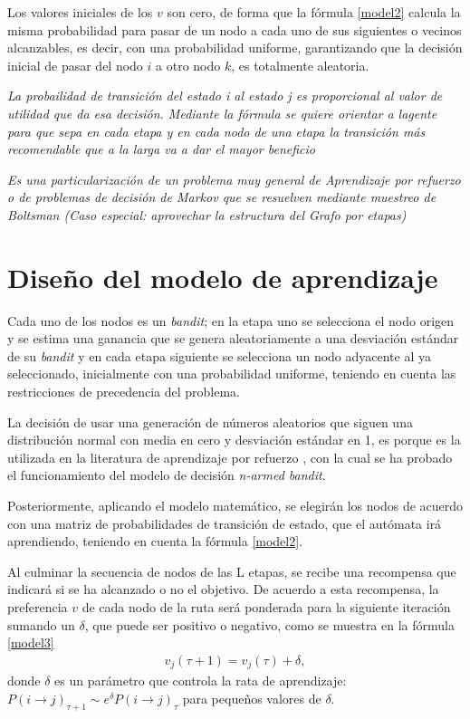 Los valores iniciales de los $v$ son cero, de forma que la fórmula \ref{model2} calcula la misma probabilidad para pasar de un nodo a cada uno de sus siguientes o vecinos alcanzables, es decir, con una probabilidad uniforme, garantizando que la decisión inicial de pasar del nodo $i$ a otro nodo $k$, es totalmente aleatoria.

\textit{La probailidad de transición del estado i al estado j es proporcional al valor de utilidad que da esa decisión. Mediante la fórmula se quiere orientar a lagente para que sepa en cada etapa y en cada nodo de una etapa la transición más recomendable que a la larga va a dar el mayor beneficio}

\textit{Es una particularización de un problema muy general de Aprendizaje por refuerzo o de problemas de decisión de Markov que se resuelven mediante muestreo de Boltsman (Caso especial: aprovechar la estructura del Grafo por etapas)}

\section{Diseño del modelo de aprendizaje} \label{aprende}
Cada uno de los nodos es un \textit{bandit}; en la etapa uno se selecciona el nodo origen y se estima una ganancia que se genera aleatoriamente a una desviación estándar de su \textit{bandit} y en cada etapa siguiente se selecciona un nodo adyacente al ya seleccionado, inicialmente con una probabilidad uniforme, teniendo en cuenta las restricciones de precedencia del problema. 

La decisión de usar una generación de números aleatorios que siguen una distribución normal con media en cero y desviación estándar en 1, es porque es la utilizada en la literatura de aprendizaje por refuerzo \citep{sutton1992reinforcement}, con la cual se ha probado el funcionamiento del modelo de decisión \textit{n-armed bandit}. 

Posteriormente, aplicando el modelo matemático, se elegirán los nodos de acuerdo con una matriz de probabilidades de transición de estado, que el autómata irá aprendiendo, teniendo en cuenta la fórmula \ref{model2}.

Al culminar la secuencia de nodos de las L etapas, se recibe una recompensa que indicará si se ha alcanzado o no el objetivo. De acuerdo a esta recompensa, la preferencia $v$ de cada nodo de la ruta será ponderada para la siguiente iteración sumando un $\delta$, que puede ser positivo o negativo, como se muestra en la fórmula \ref{model3}
\begin{eqnarray}\label{model3}
v_j(\tau + 1) = v_j(\tau) + \delta,
\end{eqnarray}
donde $\delta$ es un parámetro que controla la rata de aprendizaje: $P(i \to j)_{\tau+1} \sim e^{\delta} P(i \to j)_{\tau}$ para pequeños valores de $\delta$.

